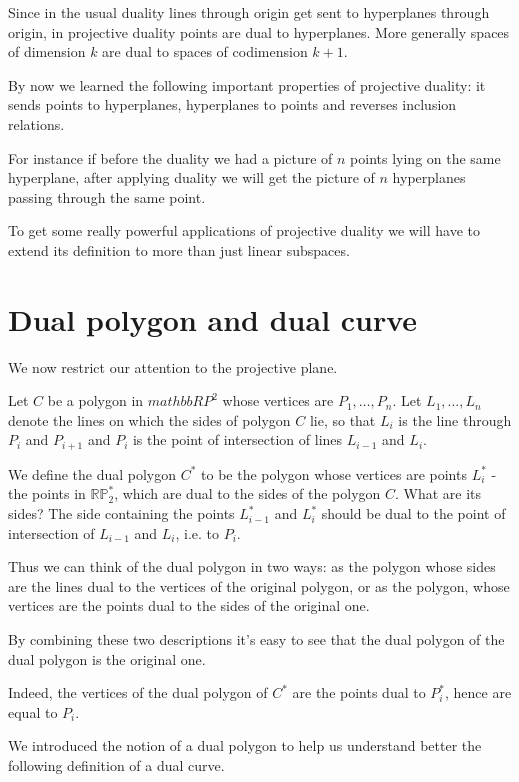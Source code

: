 Since in the usual duality lines through origin get sent to hyperplanes through origin, in projective duality points are dual to hyperplanes. More generally spaces of dimension $k$ are dual to spaces of codimension $k+1$.

By now we learned the following important properties of projective duality: it sends points to hyperplanes, hyperplanes to points and reverses inclusion relations.

For instance if before the duality we had a picture of $n$ points lying on the same hyperplane, after applying duality we will get the picture of $n$ hyperplanes passing through the same point.

To get some really powerful applications of projective duality we will have to extend its definition to more than just linear subspaces.

\section{Dual polygon and dual curve}

We now restrict our attention to the projective plane.

Let $C$ be a polygon in $mathbb{RP}^2$ whose vertices are $P_1,\ldots,P_n$. Let $L_1,\ldots,L_n$ denote the lines on which the sides of polygon $C$ lie, so that $L_i$ is the line through $P_i$ and $P_{i+1}$ and $P_i$ is the point of intersection of lines $L_{i-1}$ and $L_i$.

We define the dual polygon $C^*$ to be the polygon whose vertices are points $L_i^*$ - the points in $\mathbb{RP}_2^*$, which are dual to the sides of the polygon $C$. What are its sides? The side containing the points $L_{i-1}^*$ and $L_{i}^*$ should be dual to the point of intersection of $L_{i-1}$ and $L_i$, i.e. to $P_i$.

Thus we can think of the dual polygon in two ways: as the polygon whose sides are the lines dual to the vertices of the original polygon, or as the polygon, whose vertices are the points dual to the sides of the original one.

By combining these two descriptions it's easy to see that the dual polygon of the dual polygon is the original one.

Indeed, the vertices of the dual polygon of $C^*$ are the points dual to $P_i^*$, hence are equal to $P_i$.

We introduced the notion of a dual polygon to help us understand better the following definition of a dual curve.

